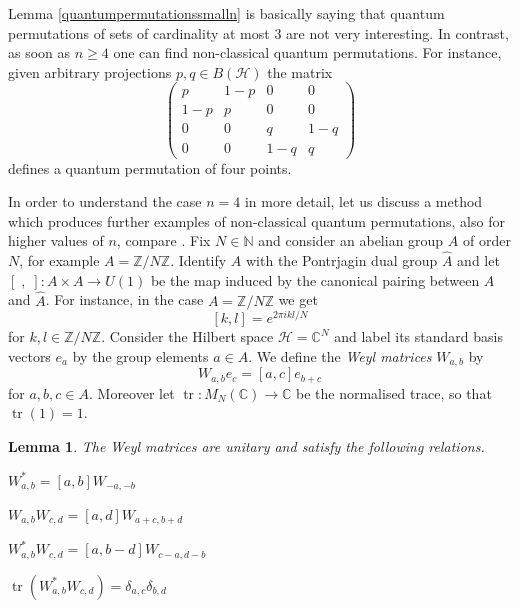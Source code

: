 \documentclass[a4paper]{amsart}
\newcommand*{\Hc}{\mathcal{H}}
\DeclareMathOperator{\tr}{tr}
\newenvironment{bnum}
{\begin{list}{}
    {\setlength{\labelwidth}{15pt}
     \setlength{\leftmargin}{\labelwidth}
    }
}
{\end{list}}
\numberwithin{equation}{section}
\theoremstyle{change}
\newtheorem{lemma}[theorem]{Lemma}
\begin{document}
Lemma \ref{quantumpermutationssmalln} is basically saying that quantum permutations of sets of cardinality at most $ 3 $ are not very interesting. In contrast, as soon as $ n \geq 4 $ one can find non-classical quantum permutations. For instance, given arbitrary projections $ p,q \in B(\Hc) $ the matrix 
$$
\begin{pmatrix} 
p & 1 - p & 0 & 0 \\
1 - p & p & 0 & 0 \\
0 & 0 & q & 1 - q \\
0 & 0 & 1 - q & q 
\end{pmatrix} 
$$
defines a quantum permutation of four points. 

In order to understand the case $ n = 4 $ in more detail, let us discuss a method which produces further examples of non-classical quantum permutations, also for higher values of $ n $, compare \cite[Chapter 16a]{BANICA_quantumpermutationgroups}.  
Fix $ N \in \mathbb{N} $ and consider an abelian group $ A $ of order $ N $, for example $ A = \mathbb{Z}/N \mathbb{Z} $. Identify $ A $ with the Pontrjagin dual group $ \widehat{A} $ and let $ [ \;, \; ]: A \times A \rightarrow U(1)  $ be the map induced by the canonical pairing between $ A $ and $ \widehat{A} $. For instance, in the case $ A = \mathbb{Z}/N \mathbb{Z} $ we get 
$$
[k, l] = e^{2 \pi i kl/N} 
$$
for $ k,l \in \mathbb{Z}/N \mathbb{Z} $. Consider the Hilbert space $ \Hc = \mathbb{C}^N $ and label its standard basis vectors $ e_a $ by the group elements $ a \in A $. 
We define the \emph{Weyl matrices} $ W_{a,b} $ by 
$$
W_{a,b} e_c = [a,c] e_{b + c} 
$$
for $ a,b,c \in A $. Moreover let $ \tr: M_N(\mathbb{C}) \rightarrow \mathbb{C} $ be the normalised trace, so that $ \tr(1) = 1 $. 

\begin{lemma} \label{weyllemma}
The Weyl matrices are unitary and satisfy the following relations. 
\begin{bnum} 
\item[a)] $ W_{a,b}^* = [a,b] W_{-a, -b} $ 
\item[b)] $ W_{a,b} W_{c,d} = [a,d] W_{a + c, b + d} $
\item[c)] $ W_{a,b}^* W_{c,d} = [a, b - d] W_{c - a, d - b} $
\item[d)] $ \tr(W_{a,b}^* W_{c,d}) = \delta_{a,c} \delta_{b,d} $
\end{bnum} 
\end{lemma} 
\end{document}
